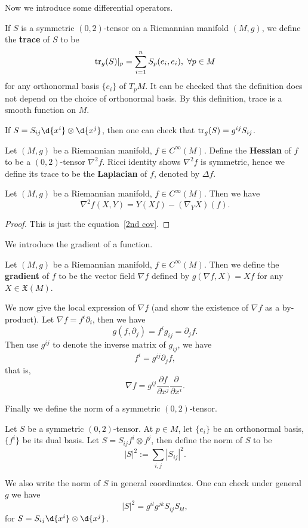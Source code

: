 Now we introduce some differential operators.

\begin{defn}
    If $S$ is a symmetric $(0,2)$-tensor on  a Riemannian manifold $(M,g)$, we define the \textbf{trace} of $S$ to be
    \[\operatorname{tr}_g(S)|_p=\sum_{i=1}^nS_p(e_i,e_i),\ \forall p\in M\]
    for any orthonormal basis $\{e_i\}$ of $T_pM$.
    It can be checked that the definition does not depend on the choice of orthonormal basis.
    By this definition, trace is a smooth function on $M$.
\end{defn}

If $S=S_{ij}\d{x^i}\otimes\d{x^j}$, then one can check that $\operatorname{tr}_g(S)=g^{ij}S_{ij}$.

\begin{defn}
    Let $(M,g)$ be a Riemannian manifold, $f\in C^\infty(M)$.
    Define the \textbf{Hessian} of $f$ to be a $(0,2)$-tensor $\nabla^2f$.
    Ricci identity shows $\nabla^2f$ is symmetric, hence we define its trace to be the \textbf{Laplacian} of $f$, denoted by $\Delta f$.
\end{defn}

\begin{prop}
    Let $(M,g)$ be a Riemannian manifold, $f\in C^\infty(M)$.
    Then we have
    \[\nabla^2f(X,Y)=Y(Xf)-(\nabla_YX)(f).\]
\end{prop}
\begin{proof}
    This is just the equation~\ref{2nd cov}.
\end{proof}

We introduce the gradient of a function.
\begin{defn}
    Let $(M,g)$ be a Riemannian manifold, $f\in C^\infty(M)$.
    Then we define the \textbf{gradient} of $f$ to be the vector field $\nabla f$ defined by $g(\nabla f,X)=Xf$ for any $X\in\mathfrak{X}(M)$.
\end{defn}

We now give the local expression of $\nabla f$ (and show the existence of $\nabla f$ as a by-product).
Let $\nabla f=f^i\partial_i$, then we have
\[g(f,\partial_j)=f^ig_{ij}=\partial_jf.\]
Then use $g^{ij}$ to denote the inverse matrix of $g_{ij}$, we have
\[f^i=g^{ij}\partial_jf,\]
that is,
\[\nabla f=g^{ij}\frac{\partial f}{\partial x^{j}}\frac{\partial{}}{\partial{x^i}}.\]

Finally we define the norm of a symmetric $(0,2)$-tensor.

\begin{defn}
    Let $S$ be a symmetric $(0,2)$-tensor.
    At $p\in M$, let $\{e_i\}$ be an orthonormal basis, $\{f^i\}$ be its dual basis.
    Let $S=S_{ij}f^i\otimes f^j$, then define the norm of $S$ to be
    \[|S|^2:=\sum_{i,j}|S_{ij}|^2.\]
\end{defn}

We also write the norm of $S$ in general coordinates.
One can check under general $g$ we have
\[|S|^2=g^{il}g^{jk}S_{ij}S_{kl},\]
for $S=S_{ij}\d{x^i}\otimes\d{x^j}$.